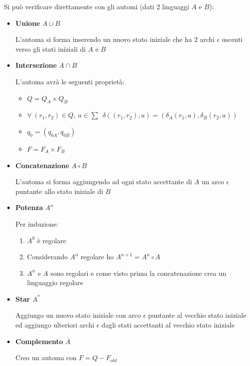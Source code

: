 \documentclass{article}
\begin{document}
\noindent Si può verificare direttamente con gli automi (dati 2 linguaggi $A$ e $B$):
\begin{itemize}
    \item \textbf{Unione} $A\cup B$

    L'automa si forma inserendo un nuovo stato iniziale che ha 2 archi $\epsilon$ uscenti verso gli stati iniziali di $A$ e $B$

    \item \textbf{Intersezione} $A\cap B$

    L'automa avrà le seguenti proprietà:
    \begin{itemize}
        \item $Q=Q_A\times Q_B$
        \item $\forall\ (r_1,r_2)\in Q,\ a\in \sum \ \ \delta((r_1,r_2),a)=(\delta_A(r_1,a),\delta_B(r_2,a))$
        \item $q_0=(q_{0A},q_{0B})$
        \item $F=F_A\times F_B$
    \end{itemize}

    \item \textbf{Concatenazione} $A\circ B$

    L'automa si forma aggiungendo ad ogni stato accettante di $A$ un arco $\epsilon$ puntante allo stato iniziale di $B$

    \item \textbf{Potenza} $A^n$

    Per induzione:
    
    \begin{enumerate}
        \item $A^0$ è regolare
        \item Considerando $A^n$ regolare ho $A^{n+1}=A^n\circ A$
        \item $A^n$ e $A$ sono regolari e come visto prima la concatenazione crea un linguaggio regolare
    \end{enumerate}

    \item \textbf{Star} $A^*$

    Aggiungo un nuovo stato iniziale con arco $\epsilon$ puntante al vecchio stato iniziale ed aggiungo ulteriori archi $\epsilon$ dagli stati accettanti al vecchio stato iniziale

    \item \textbf{Complemento} $\bar{A}$

    Creo un automa con $F=Q-F_{old}$
    
\end{itemize}
\end{document}
